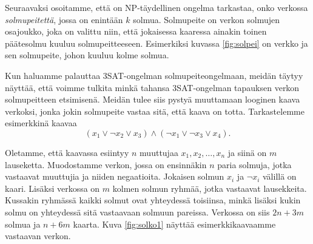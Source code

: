 Seuraavaksi osoitamme, että on NP-täydellinen ongelma tarkastaa,
onko verkossa \emph{solmupeitettä}, jossa on enintään $k$ solmua.
Solmupeite on verkon solmujen osajoukko, joka on valittu niin,
että jokaisessa kaaressa ainakin toinen päätesolmu kuuluu
solmupeitteeseen.
Esimerkiksi kuvassa \ref{fig:solpei} on verkko ja sen solmupeite,
johon kuuluu kolme solmua.

Kun haluamme palauttaa 3SAT-ongelman solmupeiteongelmaan,
meidän täytyy näyttää, että voimme tulkita minkä tahansa
3SAT-ongelman tapauksen verkon solmupeitteen etsimisenä.
Meidän tulee siis pystyä muuttamaan looginen kaava verkoksi,
jonka jokin solmupeite vastaa sitä, että kaava on totta.
Tarkastelemme esimerkkinä kaavaa
\[(x_1 \lor \neg x_2 \lor x_3) \land (\neg x_1 \lor \neg x_3 \lor x_4).\]

Oletamme, että kaavassa esiintyy $n$ muuttujaa $x_1,x_2,\dots,x_n$
ja siinä on $m$ lauseketta.
Muodostamme verkon, jossa on ensinnäkin $n$ paria solmuja,
jotka vastaavat muuttujia ja niiden negaatioita.
Jokaisen solmun $x_i$ ja $\neg x_i$ välillä on kaari.
Lisäksi verkossa on $m$ kolmen solmun ryhmää,
jotka vastaavat lausekkeita.
Kussakin ryhmässä kaikki solmut ovat yhteydessä toisiinsa,
minkä lisäksi kukin solmu on yhteydessä sitä vastaavaan solmuun pareissa.
Verkossa on siis $2n+3m$ solmua ja $n+6m$ kaarta.
Kuva \ref{fig:solko1} näyttää esimerkkikaavaamme vastaavan verkon.

